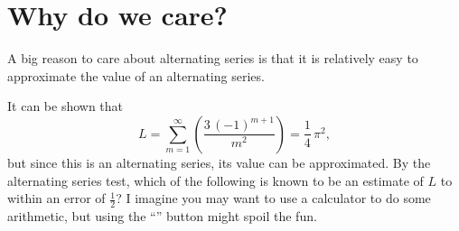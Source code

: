 \documentclass{ximera}
\begin{document}
\section{Why do we care?}

A big reason to care about alternating series is that it is relatively easy to approximate the value of an alternating series.


\begin{question}
  It can be shown that \[L = \displaystyle\sum_{m=1}^\infty \left( \displaystyle\frac{3 \, \left(-1\right)^{m + 1}}{m^{2}} \right) = \displaystyle\frac{1}{4} \, \pi^{2},\] but since this is an alternating series, its value can be approximated.  By the alternating series test, which of the following is known to be an estimate of \(L\) to within an error of \(\displaystyle\frac{1}{2}\)?  I imagine you may want to use a calculator to do some arithmetic, but using the ``\pi'' button might spoil the fun.


\end{question}
\end{document}
